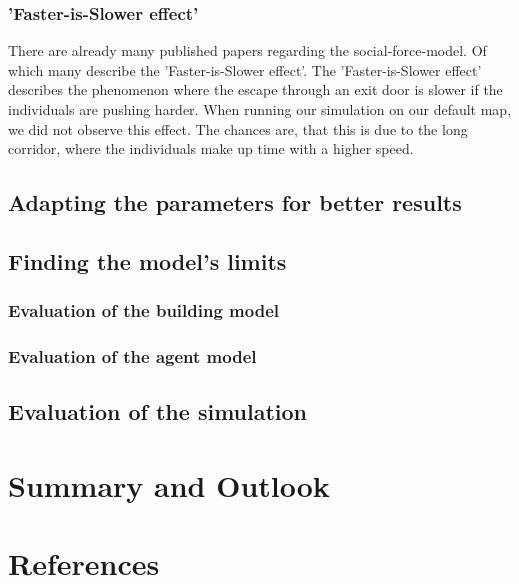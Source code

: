 \documentclass[11pt]{article}
\begin{document}
\subsubsection{'Faster-is-Slower effect'}%
    There are already many published papers regarding the social-force-model. Of which many describe the 'Faster-is-Slower effect'. The 'Faster-is-Slower effect' describes the phenomenon where the escape through an exit door is slower if the individuals are pushing harder. When running our simulation on our default map, we did not observe this effect. The chances are, that this is due to the long corridor, where the individuals make up time with a higher speed.

\subsection{Adapting the parameters for better results}

\subsection{Finding the model's limits}

\subsubsection{Evaluation of the building model}
\subsubsection{Evaluation of the agent model}

\subsection{Evaluation of the simulation}

\section{Summary and Outlook}

\section{References}
\end{document}
